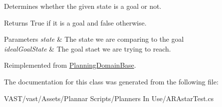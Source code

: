 Determines whether the given state is a goal or not. 

\begin{DoxyReturn}{Returns}
True if it is a goal and false otherwise. 
\end{DoxyReturn}

\begin{DoxyParams}{Parameters}
{\em state} & The state we are comparing to the goal \\
\hline
{\em ideal\-Goal\-State} & The goal staet we are trying to reach. \\
\hline
\end{DoxyParams}


Reimplemented from \hyperlink{class_planning_domain_base_a56907006c1e4a4071f58da65705792d1}{Planning\-Domain\-Base}.



The documentation for this class was generated from the following file\-:\begin{DoxyCompactItemize}
\item 
V\-A\-S\-T/vast/\-Assets/\-Plannar Scripts/\-Planners In Use/A\-R\-Astar\-Test.\-cs\end{DoxyCompactItemize}

